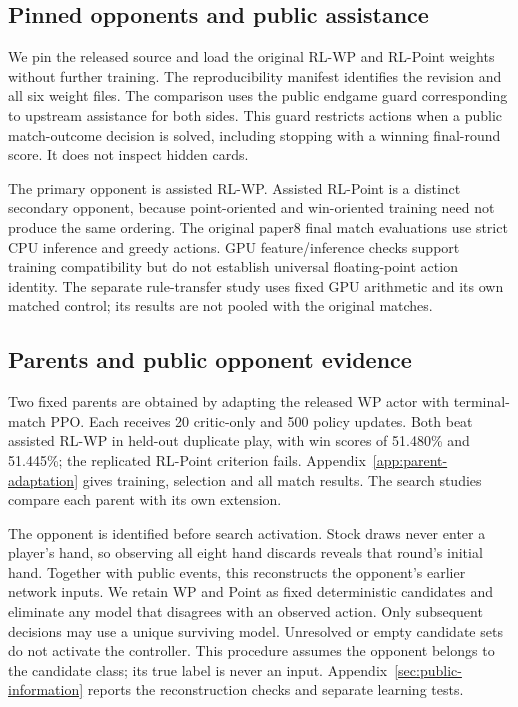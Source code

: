\documentclass[11pt]{article}
\begin{document}
\subsection{Pinned opponents and public assistance}
We pin the released source and load the original RL-WP and RL-Point
weights without further training. The reproducibility manifest identifies
the revision and all six weight files. The comparison uses the public
endgame guard corresponding to upstream assistance for both sides. This guard
restricts actions when a public match-outcome decision is solved, including
stopping with a winning final-round score. It does not inspect hidden cards.

The primary opponent is assisted RL-WP. Assisted RL-Point is a distinct
secondary opponent, because point-oriented and win-oriented training need not
produce the same ordering. The original paper8 final match evaluations use
strict CPU inference and greedy actions. GPU feature/inference checks support
training compatibility but do not establish universal floating-point action
identity. The separate rule-transfer study uses fixed GPU arithmetic and its
own matched control; its results are not pooled with the original matches.

\subsection{Parents and public opponent evidence}
Two fixed parents are obtained by adapting the released WP actor with
terminal-match PPO. Each receives 20 critic-only and 500 policy updates.
Both beat assisted RL-WP in held-out duplicate play, with win scores of
51.480\% and 51.445\%; the replicated RL-Point criterion fails.
Appendix~\ref{app:parent-adaptation} gives training, selection and all match
results. The search studies compare each parent with its own extension.

The opponent is identified before search activation. Stock draws never enter
a player's hand, so observing all eight hand discards reveals that round's
initial hand. Together with public events, this reconstructs the opponent's
earlier network inputs. We retain WP and Point as fixed deterministic
candidates and eliminate any model that disagrees with an observed action.
Only subsequent decisions may use a unique surviving model. Unresolved or
empty candidate sets do not activate the controller. This procedure assumes
the opponent belongs to the candidate class; its true label is never an input.
Appendix~\ref{sec:public-information} reports the reconstruction checks and
separate learning tests.
\end{document}
